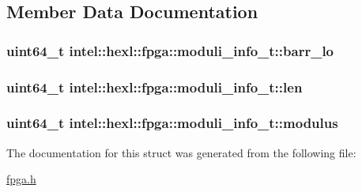 \subsection{Member Data Documentation}
\hypertarget{structintel_1_1hexl_1_1fpga_1_1moduli__info__t_ac767dd0d3287329d896e6de911c1f4af}{
\subsubsection[{barr\-\_\-lo}]{\setlength{\rightskip}{0pt plus 5cm}uint64\-\_\-t intel\-::hexl\-::fpga\-::moduli\-\_\-info\-\_\-t\-::barr\-\_\-lo}}\label{structintel_1_1hexl_1_1fpga_1_1moduli__info__t_ac767dd0d3287329d896e6de911c1f4af}
\hypertarget{structintel_1_1hexl_1_1fpga_1_1moduli__info__t_aeb4594d54e3df5373014386e6addbaa4}{
\subsubsection[{len}]{\setlength{\rightskip}{0pt plus 5cm}uint64\-\_\-t intel\-::hexl\-::fpga\-::moduli\-\_\-info\-\_\-t\-::len}}\label{structintel_1_1hexl_1_1fpga_1_1moduli__info__t_aeb4594d54e3df5373014386e6addbaa4}
\hypertarget{structintel_1_1hexl_1_1fpga_1_1moduli__info__t_af853b928372ebd6d6f7e5f2d7aa8bba7}{
\subsubsection[{modulus}]{\setlength{\rightskip}{0pt plus 5cm}uint64\-\_\-t intel\-::hexl\-::fpga\-::moduli\-\_\-info\-\_\-t\-::modulus}}\label{structintel_1_1hexl_1_1fpga_1_1moduli__info__t_af853b928372ebd6d6f7e5f2d7aa8bba7}


The documentation for this struct was generated from the following file\-:\begin{DoxyCompactItemize}
\item 
\hyperlink{fpga_8h}{fpga.\-h}\end{DoxyCompactItemize}
